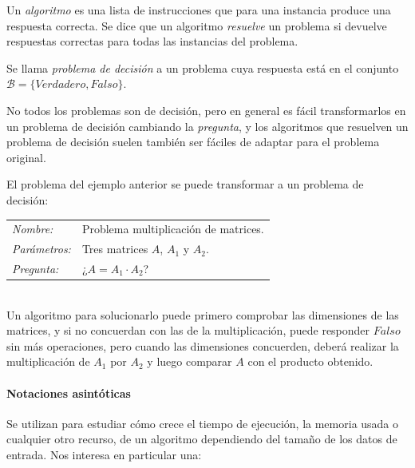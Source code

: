 \begin{definition}	
	Un \textit{algoritmo} es una lista de instrucciones que para una instancia produce una respuesta correcta. Se dice que un algoritmo \textit{resuelve} un problema si devuelve respuestas correctas para todas las instancias del problema.
\end{definition}


\begin{definition}
	Se llama \textit{problema de decisión} a un problema cuya respuesta está en el conjunto $\mathcal{B}= \{Verdadero, Falso\}$.
\end{definition}


No todos los problemas son de decisión, pero en general es fácil transformarlos en un problema de decisión cambiando la \textit{pregunta}, y los algoritmos que resuelven un problema de decisión suelen también ser fáciles de adaptar para el problema original.

\begin{example}
	El problema del ejemplo anterior se puede transformar a un problema de decisión:
	
	\begin{tabular}{|ll}
		\textit{Nombre:} & Problema multiplicación de matrices. \\
		\textit{Parámetros:} & Tres matrices $A$, $A_1$ y $A_2$. \\
		\textit{Pregunta:} & ¿$ A = A_1 \cdot A_2$? \\
	\end{tabular}
	\\
	
	Un algoritmo para solucionarlo puede primero comprobar las dimensiones de las matrices, y si no concuerdan con las de la multiplicación, puede responder $Falso$ sin más operaciones, pero cuando las dimensiones concuerden, deberá realizar la multiplicación de $A_1$ por $A_2$ y luego comparar $A$ con el producto obtenido.
	
\end{example}

\hfil

\paragraph{Notaciones asintóticas} 

\hfil

Se utilizan para estudiar cómo crece el tiempo de ejecución, la memoria usada o cualquier otro recurso, de un algoritmo dependiendo del tamaño de los datos de entrada. Nos interesa en particular una:

